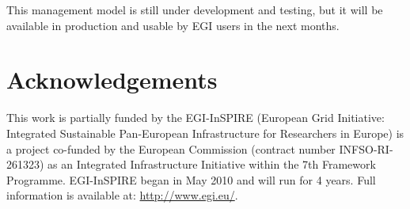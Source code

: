 \documentclass{cai}
\begin{document}
This management model is still under development and testing, but it will be available in production and usable by EGI users in the next months.

\section{Acknowledgements}
\label{sect-acknowledgements}
This work is partially funded by the  EGI-InSPIRE (European Grid Initiative: Integrated Sustainable
Pan-European Infrastructure for Researchers in Europe) is a project co-funded by the European Commission 
(contract number INFSO-RI-261323) as an Integrated Infrastructure Initiative within the 7th Framework 
Programme. EGI-InSPIRE began in May 2010 and will run for 4 years. Full information is available at:
\url{http://www.egi.eu/}.
\end{document}
